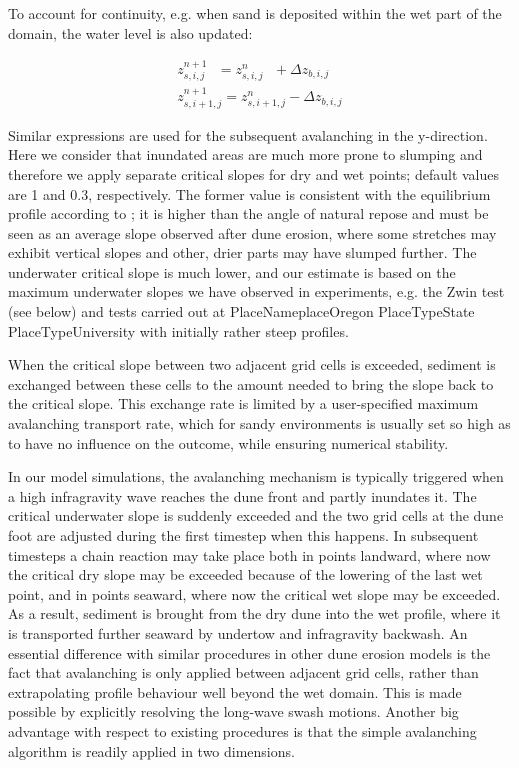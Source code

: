 To account for continuity, e.g. when sand is deposited within the wet part of the domain, the water level is also updated:

\begin{equation} \label{2.73)} 
\begin{array}{l} {z_{s,i,j}^{n+1} \, \, \, \, =z_{s,i,j}^{n} \, \, \, \, +\Delta z_{b,i,j} } \\ {z_{s,i+1,j}^{n+1} =z_{s,i+1,j}^{n} -\Delta z_{b,i,j} } \end{array} 
\end{equation} 

Similar expressions are used for the subsequent avalanching in the y-direction. Here we consider that inundated areas are much more prone to slumping and therefore we apply separate critical slopes for dry and wet points; default values are 1 and 0.3, respectively. The former value is consistent with the equilibrium profile according to \citet{Vellinga1986}; it is higher than the angle of natural repose and must be seen as an average slope observed after dune erosion, where some stretches may exhibit vertical slopes and other, drier parts may have slumped further. The underwater critical slope is much lower, and our estimate is based on the maximum underwater slopes we have observed in experiments, e.g. the Zwin test (see below) and tests carried out at PlaceNameplaceOregon PlaceTypeState PlaceTypeUniversity with initially rather steep profiles.

When the critical slope between two adjacent grid cells is exceeded, sediment is exchanged between these cells to the amount needed to bring the slope back to the critical slope. This exchange rate is limited by a user-specified maximum avalanching transport rate, which for sandy environments is usually set so high as to have no influence on the outcome, while ensuring numerical stability. 

In our model simulations, the avalanching mechanism is typically triggered when a high infragravity wave reaches the dune front and partly inundates it. The critical underwater slope is suddenly exceeded and the two grid cells at the dune foot are adjusted during the first timestep when this happens. In subsequent timesteps a chain reaction may take place both in points landward, where now the critical dry slope may be exceeded because of the lowering of the last wet point, and in points seaward, where now the critical wet slope may be exceeded. As a result, sediment is brought from the dry dune into the wet profile, where it is transported further seaward by undertow and infragravity backwash. An essential difference with similar procedures in other dune erosion models is the fact that avalanching is only applied between adjacent grid cells, rather than extrapolating profile behaviour well beyond the wet domain. This is made possible by explicitly resolving the long-wave swash motions. Another big advantage with respect to existing procedures is that the simple avalanching algorithm is readily applied in two dimensions.

